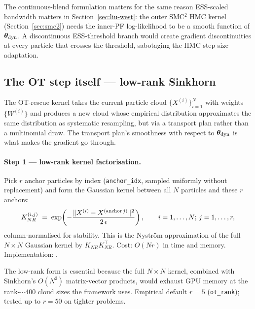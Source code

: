 The continuous-blend formulation matters for the same reason
ESS-scaled bandwidth matters in Section~\ref{sec:liu-west}: the outer
SMC$^2$ HMC kernel (Section~\ref{sec:smc2}) needs the inner-PF
log-likelihood to be a smooth function of $\bm{\theta}_{\rm dyn}$. A discontinuous
ESS-threshold branch would create gradient discontinuities at every
particle that crosses the threshold, sabotaging the HMC step-size
adaptation.

\subsection{The OT step itself --- low-rank Sinkhorn} \label{sec:sinkhorn}

The OT-rescue kernel takes the current particle cloud
$\{X^{(i)}\}_{i=1}^{N}$ with weights $\{W^{(i)}\}$ and produces a new
cloud whose empirical distribution approximates the same distribution
as systematic resampling, but via a transport plan rather than a
multinomial draw. The transport plan's smoothness with respect to
$\bm{\theta}_{\rm dyn}$ is what makes the gradient go through.

\paragraph{Step 1 --- low-rank kernel factorisation.}
Pick $r$ anchor particles by index (\texttt{anchor\_idx}, sampled
uniformly without replacement) and form the Gaussian kernel between
all $N$ particles and these $r$ anchors:
\begin{equation}
K_{NR}^{(i, j)} \;=\;
   \exp\!\left(-\frac{\|X^{(i)} - X^{({\rm anchor}\,j)}\|^2}
                       {2\,\epsilon}\right),
\qquad i = 1, \ldots, N;\, j = 1, \ldots, r,
\end{equation}
column-normalised for stability. This is the Nystr\"om approximation
of the full $N \times N$ Gaussian kernel by $K_{NR} K_{NR}^\top$. Cost:
$O(N r)$ in time and memory. Implementation:
.

The low-rank form is essential because the full $N \times N$ kernel,
combined with Sinkhorn's $O(N^2)$ matrix-vector products, would
exhaust GPU memory at the rank-$\sim$400 cloud sizes the framework
uses. Empirical default $r = 5$ (\texttt{ot\_rank}); tested up to
$r = 50$ on tighter problems.

